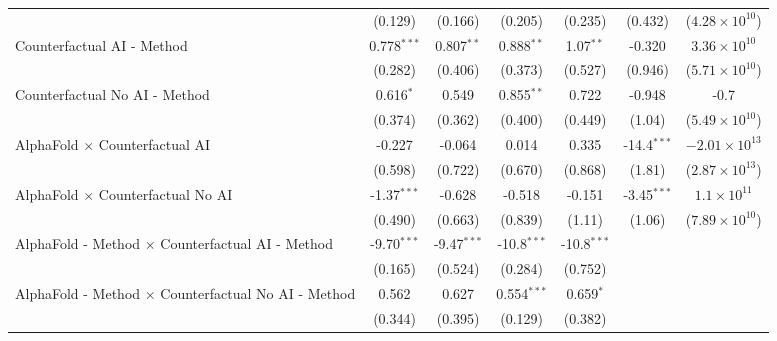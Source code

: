 \begin{tabular}{lcccccc}
                                                              & (0.129)       & (0.166)       & (0.205)       & (0.235)       & (0.432)       & ($4.28\times 10^{10}$)\\    
   Counterfactual AI - Method                                 & 0.778$^{***}$ & 0.807$^{**}$  & 0.888$^{**}$  & 1.07$^{**}$   & -0.320        & $3.36\times 10^{10}$\\    
                                                              & (0.282)       & (0.406)       & (0.373)       & (0.527)       & (0.946)       & ($5.71\times 10^{10}$)\\    
   Counterfactual No AI - Method                              & 0.616$^{*}$   & 0.549         & 0.855$^{**}$  & 0.722         & -0.948        & -0.7\\   
                                                              & (0.374)       & (0.362)       & (0.400)       & (0.449)       & (1.04)        & ($5.49\times 10^{10}$)\\    
   AlphaFold $\times$ Counterfactual AI                       & -0.227        & -0.064        & 0.014         & 0.335         & -14.4$^{***}$ & $-2.01\times 10^{13}$\\    
                                                              & (0.598)       & (0.722)       & (0.670)       & (0.868)       & (1.81)        & ($2.87\times 10^{13}$)\\    
   AlphaFold $\times$ Counterfactual No AI                    & -1.37$^{***}$ & -0.628        & -0.518        & -0.151        & -3.45$^{***}$ & $1.1\times 10^{11}$\\    
                                                              & (0.490)       & (0.663)       & (0.839)       & (1.11)        & (1.06)        & ($7.89\times 10^{10}$)\\    
   AlphaFold - Method $\times$ Counterfactual AI - Method     & -9.70$^{***}$ & -9.47$^{***}$ & -10.8$^{***}$ & -10.8$^{***}$ &               &   \\   
                                                              & (0.165)       & (0.524)       & (0.284)       & (0.752)       &               &   \\   
   AlphaFold - Method $\times$ Counterfactual No AI - Method  & 0.562         & 0.627         & 0.554$^{***}$ & 0.659$^{*}$   &               &   \\   
                                                              & (0.344)       & (0.395)       & (0.129)       & (0.382)       &               &   \\   

\end{tabular}
